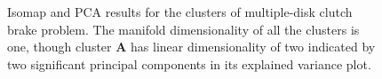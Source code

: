 \begin{figure}[ht]\begin{center}
\caption{Isomap and PCA results for the clusters of multiple-disk clutch
  brake problem. The manifold dimensionality of all the clusters is one,
  though cluster \textbf{A} has linear dimensionality of two indicated by
  two significant principal components in its explained variance plot.}
 \label{clutchClustersVar}
\end{center}\end{figure}


